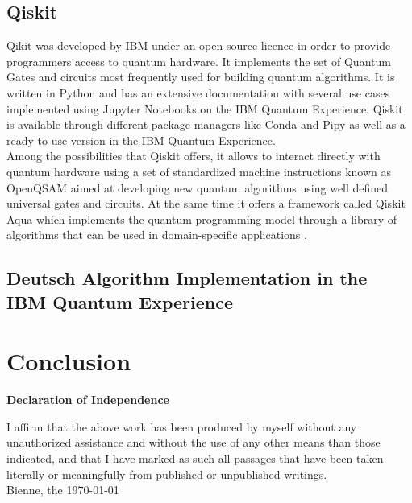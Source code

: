 \documentclass[12pt,a4paper]{scrartcl}
\begin{document}
\subsection{Qiskit}

Qikit was developed by IBM under an open source licence in order to provide programmers access to quantum hardware. It implements the set of Quantum Gates and circuits most frequently used for building quantum algorithms. It is written in Python and has an extensive documentation with several use cases implemented using Jupyter Notebooks on the IBM Quantum Experience. Qiskit is available through different package managers like Conda and Pipy as well as a ready to use version in the IBM Quantum Experience. \\

Among the possibilities that Qiskit offers, it allows to interact directly with quantum hardware using a set of standardized machine instructions known as OpenQSAM \cite{QSAM} aimed at developing new quantum algorithms using well defined universal gates and circuits. At the same time it offers a framework called Qiskit Aqua which implements the quantum programming model through a library of algorithms that can be used in domain-specific applications \cite{QiskitAqua}. 

\subsection{Deutsch Algorithm Implementation in the IBM Quantum Experience}
%

\section{Conclusion}


\markboth{}{}

\newpage





\newpage
\thispagestyle{empty}
\markboth{}{}
  \normalsize
\begin{center}
\huge{\textbf{ Declaration of Independence}}\\[40mm]
\end{center}
\large
I affirm that the above work has been produced by myself without any unauthorized assistance and without the use of any other means than those indicated, and that I have marked as such all passages that have been taken literally or meaningfully from published or unpublished writings.\\[50mm]
Bienne, the \today

\newpage
\end{document}
